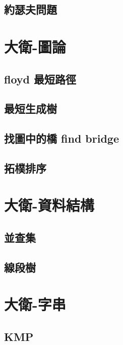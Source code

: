 \subsection{約瑟夫問題}
\raggedbottom
\hrulefill

\section{大衛-圖論}
\subsection{floyd 最短路徑}
\raggedbottom
\hrulefill
\subsection{最短生成樹}
\raggedbottom
\hrulefill
\subsection{找圖中的橋 find bridge}
\raggedbottom
\hrulefill
\subsection{拓樸排序}
\raggedbottom
\hrulefill

\section{大衛-資料結構}
\subsection{並查集}
\raggedbottom
\hrulefill
\subsection{線段樹}
\raggedbottom
\hrulefill

\section{大衛-字串}
\subsection{KMP}
\raggedbottom
\hrulefill

